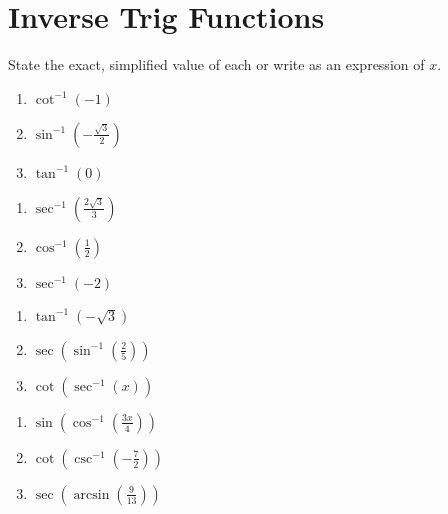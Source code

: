 \chapter{Inverse Trig Functions}

State the exact, simplified value of each or write as an expression of $x$.

\begin{multicols}{3}
\begin{enumerate}
	\item $\cot^{-1}\left(-1\right)$
	\item $\sin^{-1}\left(-\frac{\sqrt{3}}{2	}\right)$
	\item $\tan^{-1}\left(0\right)$
\end{enumerate}	\setcounter{Review}{\value{enumi}}
\end{multicols}
\smallskip
\begin{multicols}{3}
\begin{enumerate}	\setcounter{enumi}{\value{Review}}
	\item $\sec^{-1}\left(\frac{2\sqrt{3}}{3}\right)$
	\item $\cos^{-1}\left(\frac{1}{2}\right)$
	\item $\sec^{-1}\left(-2\right)$
\end{enumerate}	\setcounter{Review}{\value{enumi}}
\end{multicols}
\smallskip
\begin{multicols}{3}
\begin{enumerate}	\setcounter{enumi}{\value{Review}}
	\item $\tan^{-1}\left(-\sqrt{3}\right)$
	\item $\sec\left(\sin^{-1}\left(\frac{2}{5}\right)\right)$
	\item $\cot\left(\sec^{-1}(x)\right)$
\end{enumerate}	\setcounter{Review}{\value{enumi}}
\end{multicols}
\smallskip
\begin{multicols}{3}
\begin{enumerate}	\setcounter{enumi}{\value{Review}}
	\item $\sin\left(\cos^{-1}\left(\frac{3x}{4}\right)\right)$
	\item $\cot\left(\csc^{-1}\left(-\frac{7}{2}\right)\right)$
	\item $\sec\left(\arcsin\left(\frac{9}{13}\right)\right)$
\end{enumerate}	\setcounter{Review}{\value{enumi}}
\end{multicols}
